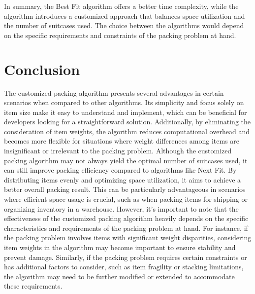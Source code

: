 \documentclass[12pt]{article}
\begin{document}
In summary, the Best Fit algorithm offers a better time complexity, while the algorithm introduces a customized approach that balances space utilization and the number of suitcases used. The choice between the algorithms would depend on the specific requirements and constraints of the packing problem at hand.



\section{Conclusion}
\hspace{1cm} The customized packing algorithm presents several advantages in certain scenarios when compared to other algorithms. Its simplicity and focus solely on item size make it easy to understand and implement, which can be beneficial for developers looking for a straightforward solution. Additionally, by eliminating the consideration of item weights, the algorithm reduces computational overhead and becomes more flexible for situations where weight differences among items are insignificant or irrelevant to the packing problem. Although the customized packing algorithm may not always yield the optimal number of suitcases used, it can still improve packing efficiency compared to algorithms like Next Fit. By distributing items evenly and optimizing space utilization, it aims to achieve a better overall packing result. This can be particularly advantageous in scenarios where efficient space usage is crucial, such as when packing items for shipping or organizing inventory in a warehouse. However, it's important to note that the effectiveness of the customized packing algorithm heavily depends on the specific characteristics and requirements of the packing problem at hand. For instance, if the packing problem involves items with significant weight disparities, considering item weights in the algorithm may become important to ensure stability and prevent damage. Similarly, if the packing problem requires certain constraints or has additional factors to consider, such as item fragility or stacking limitations, the algorithm may need to be further modified or extended to accommodate these requirements. 
\end{document}
